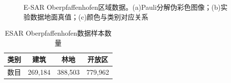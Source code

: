 \begin{figure}[ht]

  \caption{E-SAR Oberpfaffenhofen区域数据。(a)Pauli分解伪彩色图像；(b)实验数据地面真值；(c)颜色与类别对应关系}
\end{figure}

\begin{table}[ht]
  \caption{ESAR Oberpfaffenhofen数据样本数量}
  \label{tab:ober_sample}
  \centering
  \begin{tabular}{|c|c|c|c|}
    \hline
    类别 & 建筑      & 林地      & 开放区     \\ \hline
    数目 & 269,184 & 388,503 & 779,962 \\ \hline
  \end{tabular}
\end{table}

